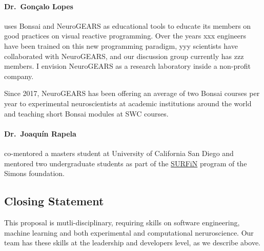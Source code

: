 \paragraph{Dr.~Gon\c{c}alo Lopes} uses Bonsai and NeuroGEARS as educational
tools to educate its members on good practices on visual reactive programming.
Over the years xxx engineers have been trained on this new programming
paradigm, yyy scientists have collaborated with NeuroGEARS, and our discussion
group currently has zzz members. I envision NeuroGEARS as a research laboratory
inside a non-profit company.

Since 2017, NeuroGEARS has been offering an average of two Bonsai courses per year to
experimental neuroscientists at academic institutions around the world and
teaching short Bonsai modules at SWC courses.

\paragraph{Dr.~Joaqu\'{i}n Rapela} co-mentored a masters student at University
of California San Diego and mentored two undergraduate students as part of the
\href{}{SURFiN} program of the Simons foundation.

\subsection*{Closing Statement}

This proposal is mutli-disciplinary, requiring skills on software engineering,
machine learning and both experimental and computational neruroscience. Our
team has these skills at the leadership and developers level, as we describe
above.

